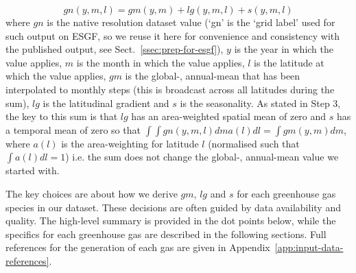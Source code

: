 \begin{itemize}
{        \begin{equation}
            \label{eq:native-resolution-sum}
            gn(y, m, l) = gm(y, m) + lg(y, m, l) + s(y, m, l)
        \end{equation}
        where $gn$ is the native resolution dataset value
        (`gn' is the `grid label' used for such output on ESGF,
        so we reuse it here for convenience and consistency with the published output,
        see Sect.~\ref{ssec:prep-for-esgf}),
        $y$ is the year in which the value applies,
        $m$ is the month in which the value applies,
        $l$ is the latitude at which the value applies,
        $gm$ is the global-, annual-mean that has been interpolated to monthly steps (this is broadcast across all latitudes during the sum),
        $lg$ is the latitudinal gradient
        and $s$ is the seasonality.
        As stated in Step 3, the key to this sum is that $lg$ has an area-weighted spatial mean of zero
        and $s$ has a temporal mean of zero
        so that $\int \int gn(y, m, l) dm a(l) dl = \int gm(y, m) dm$,
        where $a(l)$ is the area-weighting for latitude $l$ (normalised such that $\int a(l) dl = 1$)
        i.e. the sum does not change the global-, annual-mean value we started with.
    }

\end{itemize}

The key choices are about how we derive $gm$, $lg$ and $s$ for each greenhouse gas species in our dataset.
These decisions are often guided by data availability and quality.
The high-level summary is provided in the dot points below,
while the specifics for each greenhouse gas are described in the following sections.
Full references for the generation of each gas are given in Appendix~\ref{app:input-data-references}.

